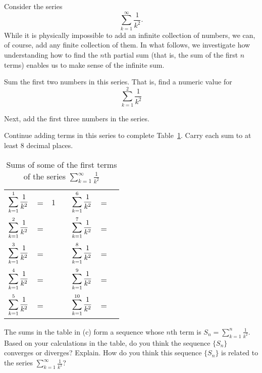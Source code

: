 \begin{activity} \label{8.3.Act1} Consider the series
\[\sum_{k=1}^{\infty} \frac{1}{k^2}.\]
While it is physically impossible to add an infinite collection of numbers, we can, of course, add any finite collection of them.  In what follows, we investigate how understanding how to find the $n$th partial sum (that is, the sum of the first $n$ terms) enables us to make sense of the infinite sum.
\ba
\item Sum the first two numbers in this series. That is, find a numeric value for
\[\sum_{k=1}^2 \frac{1}{k^2}\]

\item Next, add the first three numbers in the series.

\item Continue adding terms in this series to complete Table~\ref{T:8.3.1_part_sum_ex}. Carry each sum to at least 8 decimal places.
\begin{table}[ht]
\begin{center}
\renewcommand{\arraystretch}{1.5}
\begin{tabular}{r c p{0.5in} p{1.0in} r c p{0.5in}}
$\displaystyle \sum_{k=1}^{1} \frac{1}{k^2}$   & = & $1$  &   &$\displaystyle \sum_{k=1}^{6} \frac{1}{k^2}$   &= & \\
$\displaystyle \sum_{k=1}^{2} \frac{1}{k^2}$   & = &     &   &$\displaystyle \sum_{k=1}^{7} \frac{1}{k^2}$   & = & \\
$\displaystyle \sum_{k=1}^{3} \frac{1}{k^2}$   & = &     &   &$\displaystyle \sum_{k=1}^{8} \frac{1}{k^2}$   & = &  \\
$\displaystyle \sum_{k=1}^{4} \frac{1}{k^2}$   & = &     &   &$\displaystyle \sum_{k=1}^{9} \frac{1}{k^2}$   &  = &\\
$\displaystyle \sum_{k=1}^{5} \frac{1}{k^2}$   & = &     &   &$\displaystyle \sum_{k=1}^{10} \frac{1}{k^2}$  & = & \\
\end{tabular}
\caption{Sums of some of the first terms of the series $\sum_{k=1}^{\infty} \frac{1}{k^2}$} \label{T:8.3.1_part_sum_ex}
\end{center}
\end{table}

\item The sums in the table in (c) form a sequence whose $n$th term is $S_n =  \sum_{k=1}^{n} \frac{1}{k^2}$. Based on your calculations in the table, do you think the sequence $\{S_n\}$ converges or diverges? Explain. How do you think this sequence $\{S_n\}$ is related to the series $ \sum_{k=1}^{\infty} \frac{1}{k^2}$?

\ea
\end{activity}

